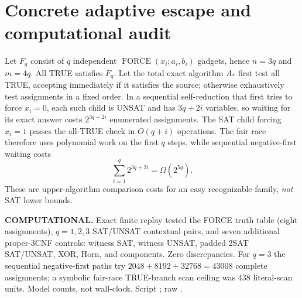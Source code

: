 \documentclass[11pt]{article}
\begin{document}
\section{Concrete adaptive escape and computational audit}
Let $F_q$ consist of $q$ independent $\operatorname{FORCE}(x_i;a_i,b_i)$ gadgets, hence $n=3q$ and $m=4q$. All TRUE satisfies $F_q$. Let the total exact algorithm $A_*$ first test all TRUE, accepting immediately if it satisfies the source; otherwise exhaustively test assignments in a fixed order. In a sequential self-reduction that first tries to force $x_i=0$, each such child is UNSAT and has $3q+2i$ variables, so waiting for its exact answer costs $2^{3q+2i}$ enumerated assignments. The SAT child forcing $x_i=1$ passes the all-TRUE check in $O(q+i)$ operations. The fair race therefore uses polynomial work on the first $q$ steps, while sequential negative-first waiting costs
\[
\sum_{i=1}^{q}2^{3q+2i}=\Omega(2^{5q}).
\tag{6}
\]
These are upper-algorithm comparison costs for an easy recognizable family, \emph{not} SAT lower bounds.
\par\noindent\textbf{COMPUTATIONAL.} Exact finite replay tested the FORCE truth table (eight assignments), $q=1,2,3$ SAT/UNSAT contextual pairs, and seven additional proper-3CNF controls: witness SAT, witness UNSAT, padded 2SAT SAT/UNSAT, XOR, Horn, and components. Zero discrepancies. For $q=3$ the sequential negative-first paths try $2048+8192+32768=43008$ complete assignments; a symbolic fair-race TRUE-branch scan ceiling was 438 literal-scan units. Model counts, not wall-clock. Script ; raw .
\end{document}
